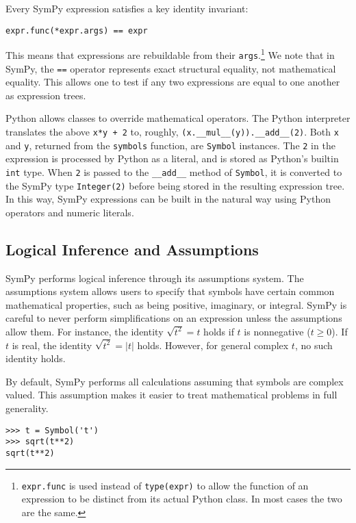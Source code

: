 Every SymPy expression satisfies a key identity invariant:
\begin{verbatim}
expr.func(*expr.args) == expr
\end{verbatim}
This means that expressions are
rebuildable from their \texttt{args}.\footnote{\texttt{expr.func} is used
instead of \texttt{type(expr)} to allow the function of an expression to be
distinct from its actual Python class. In most cases the two are the same.}
We note that in SymPy, the \texttt{==} operator represents exact
structural equality, not mathematical equality. This allows one to test if
any two expressions are equal to one another as expression trees.

Python allows classes to override mathematical operators. The Python
interpreter translates the above \texttt{x*y + 2} to, roughly,
\verb|(x.__mul__(y)).__add__(2)|. Both \texttt{x} and \texttt{y}, returned
from the \texttt{symbols} function, are \texttt{Symbol} instances. The
\texttt{2} in the expression is processed by Python as a literal, and is
stored as Python's builtin \texttt{int} type. When \texttt{2} is passed to the
\verb|__add__| method of \texttt{Symbol}, it is converted to the SymPy type
\verb|Integer(2)| before being stored in the resulting expression tree. In
this way, SymPy expressions can be built in the natural way using Python
operators and numeric literals.

\subsection{Logical Inference and Assumptions}

SymPy performs logical inference through its assumptions system. The
assumptions system allows users to specify that symbols have certain common
mathematical properties, such as being positive, imaginary, or integral. SymPy
is careful to never perform simplifications on an expression unless the
assumptions allow them. For instance, the identity $\sqrt{t^2} = t$ holds if
$t$ is nonnegative ($t\ge 0$). If $t$ is real, the identity $\sqrt{t^2}=|t|$
holds. However, for general complex $t$, no such identity holds.

By default, SymPy performs all calculations assuming that symbols are
complex valued. This assumption makes it easier to treat mathematical problems
in full generality.
\begin{verbatim}
>>> t = Symbol('t')
>>> sqrt(t**2)
sqrt(t**2)
\end{verbatim}

